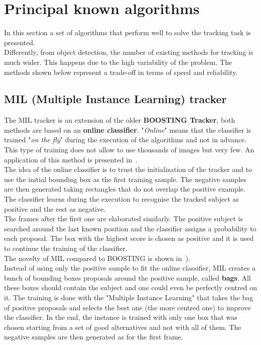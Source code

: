 \section{Principal known algorithms}
In this section a set of algorithms that perform well to solve the tracking task is presented.\\
Differently, from object detection, the number of existing methods for tracking is much wider. This happens due to the high variability of the problem. The methods shown below represent a trade-off in terms of speed and reliability.


\subsection{MIL (Multiple Instance Learning) tracker}
The MIL tracker\cite{mil}\cite{mil-robust} is an extension of the older \textbf{BOOSTING Tracker}\cite{boosting}, both methods are based on an \textbf{online classifier}. "\textit{Online}" means that the classifier is trained "\textit{on the fly}" during the execution of the algorithms and not in advance. This type of training does not allow to use thousands of images but very few. An application of this method is presented in~.\\
The idea of the online classifier is to trust the initialization of the tracker and to use the initial bounding box as the first training sample. The negative samples are then generated taking rectangles that do not overlap the positive example. The classifier learns during the execution to recognise the tracked subject as positive and the rest as negative.\\
The frames after the first one are elaborated similarly. The positive subject is searched around the last known position and the classifier assigns a probability to each proposal. The box with the highest score is chosen as positive and it is used to continue the training of the classifier.\\
The novelty of MIL compared to BOOSTING is shown in~).\\
Instead of using only the positive sample to fit the online classifier, MIL creates a bunch of bounding boxes proposals around the positive sample, called \textbf{bags}. All these boxes should contain the subject and one could even be perfectly centred on it. The training is done with the "Multiple Instance Learning" that takes the bag of positive proposals and selects the best one (the more centred one) to improve the classifier. In the end, the instance is trained with only one box that was chosen starting from a set of good alternatives and not with all of them. The negative samples are then generated as for the first frame.

